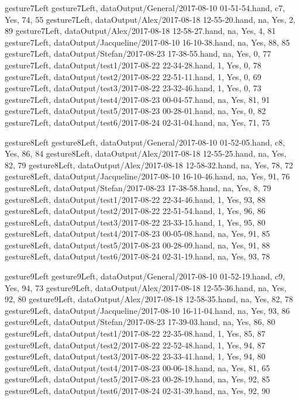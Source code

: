gesture7Left
gesture7Left, dataOutput/General/2017-08-10 01-51-54.hand, c7, Yes, 74, 55
gesture7Left, dataOutput/Alex/2017-08-18 12-55-20.hand, na, Yes, 2, 89
gesture7Left, dataOutput/Alex/2017-08-18 12-58-27.hand, na, Yes, 4, 81
gesture7Left, dataOutput/Jacqueline/2017-08-10 16-10-38.hand, na, Yes, 88, 85
gesture7Left, dataOutput/Stefan/2017-08-23 17-38-55.hand, na, Yes, 0, 77
gesture7Left, dataOutput/test1/2017-08-22 22-34-28.hand, 1, Yes, 0, 78
gesture7Left, dataOutput/test2/2017-08-22 22-51-11.hand, 1, Yes, 0, 69
gesture7Left, dataOutput/test3/2017-08-22 23-32-46.hand, 1, Yes, 0, 73
gesture7Left, dataOutput/test4/2017-08-23 00-04-57.hand, na, Yes, 81, 91
gesture7Left, dataOutput/test5/2017-08-23 00-28-01.hand, na, Yes, 0, 82
gesture7Left, dataOutput/test6/2017-08-24 02-31-04.hand, na, Yes, 71, 75

gesture8Left
gesture8Left, dataOutput/General/2017-08-10 01-52-05.hand, c8, Yes, 86, 84
gesture8Left, dataOutput/Alex/2017-08-18 12-55-25.hand, na, Yes, 82, 79
gesture8Left, dataOutput/Alex/2017-08-18 12-58-32.hand, na, Yes, 78, 72
gesture8Left, dataOutput/Jacqueline/2017-08-10 16-10-46.hand, na, Yes, 91, 76
gesture8Left, dataOutput/Stefan/2017-08-23 17-38-58.hand, na, Yes, 8, 79
gesture8Left, dataOutput/test1/2017-08-22 22-34-46.hand, 1, Yes, 93, 88
gesture8Left, dataOutput/test2/2017-08-22 22-51-54.hand, 1, Yes, 96, 86
gesture8Left, dataOutput/test3/2017-08-22 23-33-15.hand, 1, Yes, 95, 80
gesture8Left, dataOutput/test4/2017-08-23 00-05-08.hand, na, Yes, 91, 85
gesture8Left, dataOutput/test5/2017-08-23 00-28-09.hand, na, Yes, 91, 88
gesture8Left, dataOutput/test6/2017-08-24 02-31-19.hand, na, Yes, 93, 78

gesture9Left
gesture9Left, dataOutput/General/2017-08-10 01-52-19.hand, c9, Yes, 94, 73
gesture9Left, dataOutput/Alex/2017-08-18 12-55-36.hand, na, Yes, 92, 80
gesture9Left, dataOutput/Alex/2017-08-18 12-58-35.hand, na, Yes, 82, 78
gesture9Left, dataOutput/Jacqueline/2017-08-10 16-11-04.hand, na, Yes, 93, 86
gesture9Left, dataOutput/Stefan/2017-08-23 17-39-03.hand, na, Yes, 86, 80
gesture9Left, dataOutput/test1/2017-08-22 22-35-08.hand, 1, Yes, 85, 87
gesture9Left, dataOutput/test2/2017-08-22 22-52-48.hand, 1, Yes, 94, 87
gesture9Left, dataOutput/test3/2017-08-22 23-33-41.hand, 1, Yes, 94, 80
gesture9Left, dataOutput/test4/2017-08-23 00-06-18.hand, na, Yes, 81, 65
gesture9Left, dataOutput/test5/2017-08-23 00-28-19.hand, na, Yes, 92, 85
gesture9Left, dataOutput/test6/2017-08-24 02-31-39.hand, na, Yes, 92, 90

